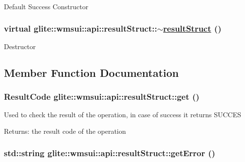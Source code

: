 Default Success Constructor \hypertarget{classglite_1_1wmsui_1_1api_1_1resultStruct_a5}{
\subsubsection[$\sim$resultStruct]{\setlength{\rightskip}{0pt plus 5cm}virtual glite::wmsui::api::result\-Struct::$\sim$\hyperlink{classglite_1_1wmsui_1_1api_1_1resultStruct}{result\-Struct} ()}}
\label{classglite_1_1wmsui_1_1api_1_1resultStruct_a5}


Destructor 

\subsection{Member Function Documentation}
\hypertarget{classglite_1_1wmsui_1_1api_1_1resultStruct_a1}{
\subsubsection[get]{\setlength{\rightskip}{0pt plus 5cm}Result\-Code glite::wmsui::api::result\-Struct::get ()}}
\label{classglite_1_1wmsui_1_1api_1_1resultStruct_a1}


Used to check the result of the operation, in case of success it returns SUCCES \begin{Desc}
\item[Returns:]the result code of the operation \end{Desc}
\hypertarget{classglite_1_1wmsui_1_1api_1_1resultStruct_a3}{
\subsubsection[getError]{\setlength{\rightskip}{0pt plus 5cm}std::string glite::wmsui::api::result\-Struct::get\-Error ()}}
\label{classglite_1_1wmsui_1_1api_1_1resultStruct_a3}


